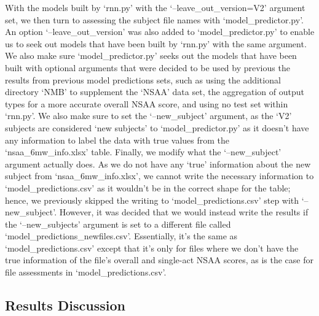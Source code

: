 \documentclass[12pt,twoside]{report}
\begin{document}
\quad With the models built by ‘rnn.py’ with the ‘--leave\_out\_version=V2’ argument set, we then turn to assessing the subject file names with ‘model\_predictor.py’. An option ‘--leave\_out\_version’ was also added to ‘model\_predictor.py’ to enable us to seek out models that have been built by ‘rnn.py’ with the same argument. We also make sure ‘model\_predictor.py’ seeks out the models that have been built with optional arguments that were decided to be used by previous the results from previous model predictions sets, such as using the additional directory ‘NMB’ to supplement the ‘NSAA’ data set, the aggregation of output types for a more accurate overall NSAA score, and using no test set within ‘rnn.py’. We also make sure to set the ‘--new\_subject’ argument, as the ‘V2’ subjects are considered ‘new subjects’ to ‘model\_predictor.py’ as it doesn’t have any information to label the data with true values from the ‘nsaa\_6mw\_info.xlsx’ table. Finally, we modify what the ‘--new\_subject’ argument actually does. As we do not have any ‘true’ information about the new subject from ‘nsaa\_6mw\_info.xlsx’, we cannot write the necessary information to ‘model\_predictions.csv’ as it wouldn’t be in the correct shape for the table; hence, we previously skipped the writing to ‘model\_predictions.csv’ step with ‘--new\_subject’. However, it was decided that we would instead write the results if the ‘--new\_subjects’ argument is set to a different file called ‘model\_predictions\_newfiles.csv’. Essentially, it’s the same as ‘model\_predictions.csv’ except that it’s only for files where we don’t have the true information of the file’s overall and single-act NSAA scores, as is the case for file assessments in ‘model\_predictions.csv’. 




\subsection{Results Discussion}
\end{document}
